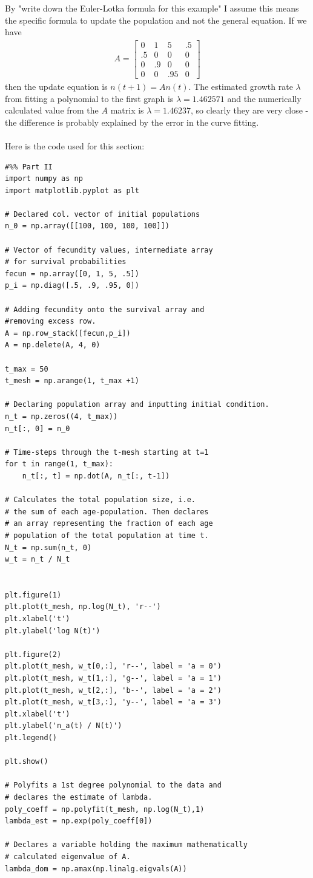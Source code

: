 \documentclass{article}
\begin{document}
By "write down the Euler-Lotka formula for this example" I assume this means the specific formula to update the population and not the general equation. If we have
\begin{gather}
 A=
  \begin{bmatrix}
   0 &
   1 &
   5 &
   .5 \\
   .5 &
   0 &
   0 &
   0 \\
   0 &
   .9 &
   0 &
   0 \\
   0 &
   0 &
   .95 &
   0
   \end{bmatrix}
 \end{gather}
then the update equation is $n(t+1) = An(t)$. The estimated growth rate $\lambda$ from fitting a polynomial to the first graph is $\lambda = 1.462571$ and the numerically calculated value from the $A$ matrix is $\lambda = 1.46237$, so clearly they are very close - the difference is probably explained by the error in the curve fitting. \\
\\
Here is the code used for this section:
\lstset{language=Python}
\lstset{frame=lines}
\lstset{basicstyle=\footnotesize}
\begin{lstlisting}
#%% Part II
import numpy as np
import matplotlib.pyplot as plt

# Declared col. vector of initial populations
n_0 = np.array([[100, 100, 100, 100]])

# Vector of fecundity values, intermediate array
# for survival probabilities
fecun = np.array([0, 1, 5, .5])
p_i = np.diag([.5, .9, .95, 0])

# Adding fecundity onto the survival array and
#removing excess row.
A = np.row_stack([fecun,p_i])
A = np.delete(A, 4, 0)

t_max = 50
t_mesh = np.arange(1, t_max +1)

# Declaring population array and inputting initial condition.
n_t = np.zeros((4, t_max))
n_t[:, 0] = n_0

# Time-steps through the t-mesh starting at t=1
for t in range(1, t_max):
    n_t[:, t] = np.dot(A, n_t[:, t-1])

# Calculates the total population size, i.e.
# the sum of each age-population. Then declares
# an array representing the fraction of each age
# population of the total population at time t.
N_t = np.sum(n_t, 0)
w_t = n_t / N_t


plt.figure(1)
plt.plot(t_mesh, np.log(N_t), 'r--')
plt.xlabel('t')
plt.ylabel('log N(t)')

plt.figure(2)
plt.plot(t_mesh, w_t[0,:], 'r--', label = 'a = 0')
plt.plot(t_mesh, w_t[1,:], 'g--', label = 'a = 1')
plt.plot(t_mesh, w_t[2,:], 'b--', label = 'a = 2')
plt.plot(t_mesh, w_t[3,:], 'y--', label = 'a = 3')
plt.xlabel('t')
plt.ylabel('n_a(t) / N(t)')
plt.legend()

plt.show()

# Polyfits a 1st degree polynomial to the data and
# declares the estimate of lambda.
poly_coeff = np.polyfit(t_mesh, np.log(N_t),1)
lambda_est = np.exp(poly_coeff[0])

# Declares a variable holding the maximum mathematically
# calculated eigenvalue of A.
lambda_dom = np.amax(np.linalg.eigvals(A))
\end{lstlisting}
\end{document}
